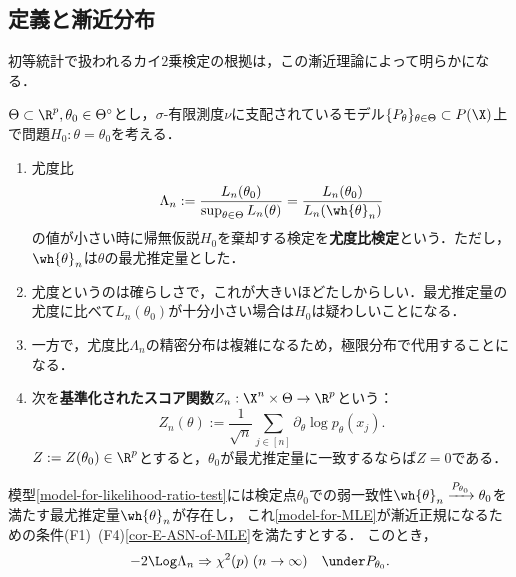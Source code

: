 \documentclass[uplatex,dvipdfmx]{jsreport}
\begin{document}
\subsection{定義と漸近分布}

\begin{tcolorbox}[colframe=ForestGreen, colback=ForestGreen!10!white,breakable,colbacktitle=ForestGreen!40!white,coltitle=black,fonttitle=\bfseries\sffamily,
title=]
    初等統計で扱われるカイ$2$乗検定の根拠は，この漸近理論によって明らかになる．
\end{tcolorbox}

\begin{model}[単純仮説の尤度比検定]\label{model-for-likelihood-ratio-test}
    $\Theta\subset\R^p,\theta_0\in\Theta^\circ$とし，$\sigma$-有限測度$\nu$に支配されているモデル$\{P_\theta\}_{\theta\in\Theta}\subset P(\X)$上で問題$H_0:\theta=\theta_0$を考える．
    \begin{enumerate}
        \item 尤度比
        \[\Lambda_n:=\frac{L_n(\theta_0)}{\sup_{\theta\in\Theta}L_n(\theta)}=\frac{L_n(\theta_0)}{L_n(\wh{\theta}_n)}\]
        の値が小さい時に帰無仮説$H_0$を棄却する検定を\textbf{尤度比検定}という．ただし，$\wh{\theta}_n$は$\theta$の最尤推定量とした．
        \item 尤度というのは確らしさで，これが大きいほどたしからしい．最尤推定量の尤度に比べて$L_n(\theta_0)$が十分小さい場合は$H_0$は疑わしいことになる．
        \item 一方で，尤度比$\Lambda_n$の精密分布は複雑になるため，極限分布で代用することになる．
        \item 次を\textbf{基準化されたスコア関数}$Z_n:\X^n\times\Theta\to\R^p$という：
        \[Z_n(\theta):=\frac{1}{\sqrt{n}}\sum_{j\in[n]}\partial_\theta\log p_\theta(x_j).\]
        $Z:=Z(\theta_0)\in\R^p$とすると，$\theta_0$が最尤推定量に一致するならば$Z=0$である．
    \end{enumerate}
\end{model}

\begin{theorem}
    模型\ref{model-for-likelihood-ratio-test}には検定点$\theta_0$での弱一致性$\wh{\theta}_n\xrightarrow{P_{\theta_0}}\theta_0$を満たす最尤推定量$\wh{\theta}_n$が存在し，
    これ\ref{model-for-MLE}が漸近正規になるための条件(F1)~(F4)\ref{cor-E-ASN-of-MLE}を満たすとする．
    このとき，
    \[-2\Log\Lambda_n\Rightarrow\chi^2(p)\;(n\to\infty)\quad\under P_{\theta_0}.\]
\end{theorem}
\end{document}
